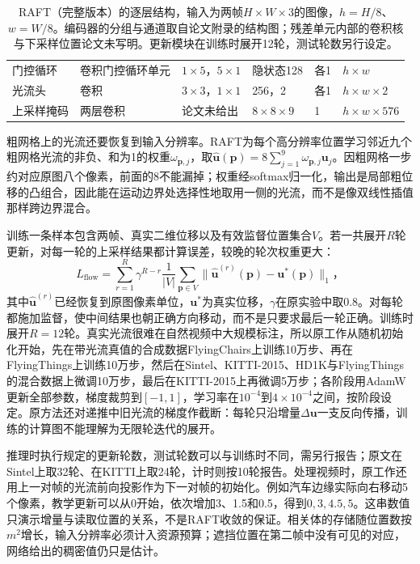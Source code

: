 \begin{table}[tbp]
\begin{tabularx}{\linewidth}{@{}llXlll@{}}
    门控循环 & 卷积门控循环单元 & $1\times5$，$5\times1$ & 隐状态128 & 各1 & $h\times w$\\
    光流头 & 卷积 & $3\times3$，$1\times1$ & 256，2 & 各1 & $h\times w\times2$\\
    上采样掩码 & 两层卷积 & 论文未给出 & $8\times8\times9$ & 1 & $h\times w\times576$\\
    \bottomrule
  \end{tabularx}
  \caption{RAFT（完整版本）的逐层结构，输入为两帧$H\times W\times3$的图像，$h=H/8$、$w=W/8$。编码器的分组与通道取自论文附录的结构图；残差单元内部的卷积核与下采样位置论文未写明。更新模块在训练时展开12轮，测试轮数另行设定。}
  \label{tab:vision-video-raft-arch}
\end{table}

粗网格上的光流还要恢复到输入分辨率。RAFT为每个高分辨率位置学习邻近九个粗网格光流的非负、和为1的权重$\omega_{\bm{p},j}$，取$\widehat{\bm{u}}(\bm{p})=8\sum_{j=1}^{9}\omega_{\bm{p},j}\bm{u}_{j}$。因粗网格一步约对应原图八个像素，前面的8不能漏掉；权重经softmax归一化，输出是局部粗位移的凸组合，因此能在运动边界处选择性地取用一侧的光流，而不是像双线性插值那样跨边界混合。

训练一条样本包含两帧、真实二维位移以及有效监督位置集合$V$。若一共展开$R$轮更新，对每一轮的上采样结果都计算误差，较晚的轮次权重更大：
\begin{equation}
  L_{\mathrm{flow}}
  =\sum_{r=1}^{R}\gamma^{R-r}
    \frac{1}{|V|}\sum_{\bm{p}\in V}
    \lVert\widehat{\bm{u}}^{(r)}(\bm{p})-\bm{u}^{*}(\bm{p})\rVert_1\text{，}
  \label{eq:vision-video-raft-loss}
\end{equation}
其中$\widehat{\bm{u}}^{(r)}$已经恢复到原图像素单位，$\bm{u}^{*}$为真实位移，$\gamma$在原实验中取0.8。对每轮都施加监督，使中间结果也朝正确方向移动，而不是只要求最后一轮正确。训练时展开$R=12$轮。真实光流很难在自然视频中大规模标注，所以原工作从随机初始化开始，先在带光流真值的合成数据FlyingChairs上训练10万步、再在FlyingThings上训练10万步，然后在Sintel、KITTI-2015、HD1K与FlyingThings的混合数据上微调10万步，最后在KITTI-2015上再微调5万步；各阶段用AdamW更新全部参数，梯度裁剪到$[-1,1]$，学习率在$10^{-4}$到$4\times10^{-4}$之间，按阶段设定。原方法还对递推中旧光流的梯度作截断：每轮只沿增量$\Delta\bm{u}$一支反向传播，训练的计算图不能理解为无限轮迭代的展开。

推理时执行规定的更新轮数，测试轮数可以与训练时不同，需另行报告；原文在Sintel上取32轮、在KITTI上取24轮，计时则按10轮报告。处理视频时，原工作还用上一对帧的光流前向投影作为下一对帧的初始化。例如汽车边缘实际向右移动5个像素，教学更新可以从0开始，依次增加3、1.5和0.5，得到$0,3,4.5,5$。这串数值只演示增量与读取位置的关系，不是RAFT收敛的保证。相关体的存储随位置数按$m^2$增长，输入分辨率必须计入资源预算；遮挡位置在第二帧中没有可见的对应，网络给出的稠密值仍只是估计。


